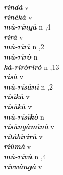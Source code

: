 \begin{multicols}{2}
{{\bfseries\itshape rìndà}} \relax  v  \relax   \relax  {} \relax   \relax  \\
{{\bfseries\itshape rínèkà}} \relax  v  \relax   \relax  {} \relax   \relax  \\
{{\bfseries\itshape mù-ríngà}} \relax  n  ,4  \relax   \relax  \\
{{\bfseries\itshape rìrà}} \relax  v  \relax  {} \relax   \relax  \\
{{\bfseries\itshape mù-rìrì}} \relax  n  ,2  \relax   \relax  \\
{{\bfseries\itshape mù-rìrò}} \relax  n   \relax  {} \relax   \relax  \\
{{\bfseries\itshape kà-rìròrìrò}} \relax  n  ,13  \relax   \relax  \\
{{\bfseries\itshape rîsà}} \relax  v  \relax   \relax  {} \relax   \relax  \\
{{\bfseries\itshape mù-rísânì}} \relax  n  ,2  \relax   \relax  \\
{{\bfseries\itshape rísìkà}} \relax  v  \relax   \relax  {} \relax   \relax  \\
{{\bfseries\itshape rísùkà}} \relax  v  \relax   \relax  {} \relax   \relax  \\
{{\bfseries\itshape mù-rísìkò}} \relax  n   \relax  {} \relax   \relax  \\
{{\bfseries\itshape rísùngàmìnà}} \relax  v  \relax   \relax  {} \relax   \relax  \\
{{\bfseries\itshape rítàbìrìrà}} \relax  v  \relax   \relax  {} \relax   \relax  \\
{{\bfseries\itshape ríùmà}} \relax  v  \relax   \relax  {} \relax   \relax  \\
{{\bfseries\itshape mù-rívù}} \relax  n  ,4  \relax   \relax  \\
{{\bfseries\itshape rívwàngà}} \relax  v  \relax   \relax  {} \relax   \relax  \\

\end{multicols}
